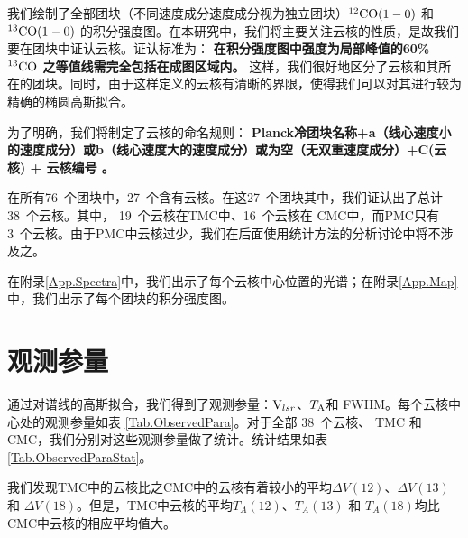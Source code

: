 \documentclass[UTF8, nocolorlinks]{pkuthss}
\newcommand{\cob}{$\rm ^{13}CO$ }
\newcommand{\coaa}{$\rm^{12}CO(1-0)$ }
\newcommand{\cobb}{$\rm^{13}CO(1-0)$ }
\newcommand{\vlsr}{${\rm V } _{lsr}$}
\newcommand{\ta}{$T_{\rm A}$}
\newcommand{\numcore}{38\ }
\newcommand{\numcoretmc}{19\ }
\newcommand{\numcorepmc}{3\ }
\newcommand{\numcorecmc}{16\ }
\newcommand{\numcompofcores}{27\ }
\newcommand{\numvelcomp}{76\ }
\begin{document}
		我们绘制了全部团块（不同速度成分速度成分视为独立团块）\coaa 和 \cobb 的积分强度图。在本研究中，我们将主要关注云核的性质，是故我们要在团块中证认云核。证认标准为：
		\textbf{在积分强度图中强度为局部峰值的60\% \cob 之等值线需完全包括在成图区域内。}
		这样，我们很好地区分了云核和其所在的团块。同时，由于这样定义的云核有清晰的界限，使得我们可以对其进行较为精确的椭圆高斯拟合。

		为了明确，我们将制定了云核的命名规则：
		\textbf{Planck冷团块名称+a（线心速度小的速度成分）或b（线心速度大的速度成分）或为空（无双重速度成分）+C(云核) + 云核编号 。}

		在所有\numvelcomp 个团块中，\numcompofcores 个含有云核。在这\numcompofcores 个团块其中，我们证认出了总计\numcore 个云核。其中， \numcoretmc 个云核在TMC中、\numcorecmc 个云核在 CMC中，而PMC只有\numcorepmc 个云核。由于PMC中云核过少，我们在后面使用统计方法的分析讨论中将不涉及之。

		在附录\ref{App.Spectra}中，我们出示了每个云核中心位置的光谱；在附录\ref{App.Map}中，我们出示了每个团块的积分强度图。

	\section{观测参量}

		通过对谱线的高斯拟合，我们得到了观测参量：\vlsr、\ta 和 FWHM。每个云核中心处的观测参量如表 \ref{Tab.ObservedPara}。对于全部 \numcore 个云核、 TMC 和 CMC，我们分别对这些观测参量做了统计。统计结果如表 \ref{Tab.ObservedParaStat}。

        我们发现TMC中的云核比之CMC中的云核有着较小的平均$\Delta V (12)$、$\Delta V (13)$ 和 $\Delta V (18)$。但是，TMC中云核的平均$T_{A}(12)$、$T_{A}(13)$ 和 $T_{A}(18)$均比CMC中云核的相应平均值大。
\end{document}
